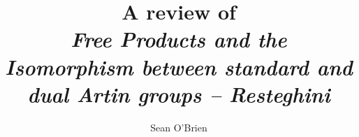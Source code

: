 \documentclass{amsart}
\begin{document}
\title[Resteghini 2024; Review]{A review of \\
	\emph{Free Products and the Isomorphism between standard and dual Artin groups -- Resteghini}}


\author{Sean O'Brien}
\address{}
\curraddr{}




\maketitle




% 




\end{document}
